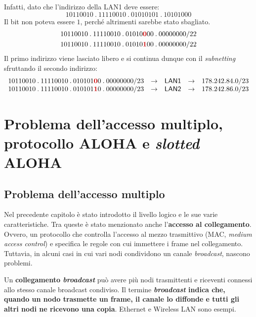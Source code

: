 \documentclass[a4paper]{article}
\newcommand{\binaryaddresspointed}[4]{#1\:.\:#2\:.\:#3\:.\:#4}
\begin{document}
	Infatti, dato che l'indirizzo della \textsf{LAN1} deve essere:
	\begin{equation*}
		\binaryaddresspointed{10110010}{11110010}{01010101}{10101000}
	\end{equation*}
	Il bit non poteva essere $1$, perché altrimenti sarebbe stato sbagliato.
	\begin{gather*}
		\binaryaddresspointed{10110010}{11110010}{01010\textcolor{Red3}{\boldsymbol{0}}00}{00000000}/22 \\
		\binaryaddresspointed{10110010}{11110010}{01010\textcolor{Red3}{\boldsymbol{1}}00}{00000000}/22
	\end{gather*}
	Il primo indirizzo viene lasciato libero e si continua dunque con il \emph{subnetting} sfruttando il secondo indirizzo:
	\begin{equation*}
		\begin{array}{lllll}
			\binaryaddresspointed{10110010}{11110010}{010101\textcolor{Red3}{\boldsymbol{0}}0}{00000000}/23 & \rightarrow & \textsf{LAN1} & \rightarrow & 178.242.84.0/23 \\
			\binaryaddresspointed{10110010}{11110010}{010101\textcolor{Red3}{\boldsymbol{1}}0}{00000000}/23 & \rightarrow & \textsf{LAN2} & \rightarrow & 178.242.86.0/23
		\end{array}
	\end{equation*}\newpage

	\section{Problema dell'accesso multiplo, protocollo ALOHA e \emph{slotted} ALOHA}
	
	\subsection{Problema dell'accesso multiplo}\label{problema accesso multiplo}
	
	Nel precedente capitolo è stato introdotto il livello logico e le sue varie caratteristiche. Tra queste è stato menzionato anche l'\textbf{accesso al collegamento}. Ovvero, un protocollo che controlla l'accesso al mezzo trasmittivo (MAC, \emph{medium access control}) e specifica le regole con cui immettere i frame nel collegamento. Tuttavia, in alcuni casi in cui vari nodi condividono un canale \emph{broadcast}, nascono problemi.\newline
	
	\noindent
	Un \textbf{collegamento \emph{broadcast}} può avere più nodi trasmittenti e riceventi connessi allo stesso canale broadcast condiviso. Il termine \textbf{\emph{broadcast} indica che, quando un nodo trasmette un frame, il canale lo diffonde e tutti gli altri nodi ne ricevono una copia}. Ethernet e Wireless LAN sono esempi.\newline
	
\end{document}
